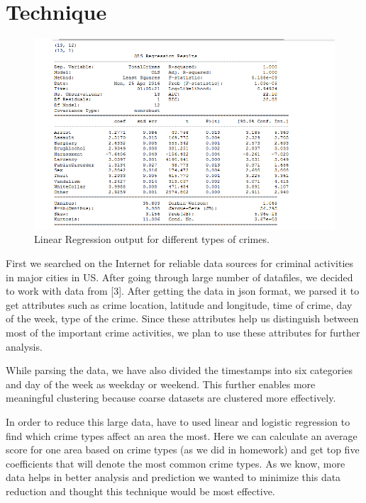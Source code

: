 \documentclass[journal, a4paper]{IEEEtran}
\begin{document}
\section{Technique}

    \begin{figure}[!hbt]
        \begin{center}
        \includegraphics[width=\columnwidth]{regression.png}
        \caption{Linear Regression output for different types of crimes.}
        \label{fig:tf_plot}
        \end{center}
    \end{figure}

    First we searched on the Internet for reliable data sources for criminal activities in major cities in US. After going through large number of datafiles, we decided to work with data from [3]. After getting the data in json format, we parsed it to get attributes such as crime location, latitude and longitude, time of crime, day of the week, type of the crime. Since these attributes help us distinguish between most of the important crime activities, we plan to use these attributes for further analysis. 

    While parsing the data, we have also divided the timestamps into six categories and day of the week as weekday or weekend. This further enables more meaningful clustering because coarse datasets are clustered more effectively.

    In order to reduce this large data, have to used linear and logistic regression to find which crime types affect an area the most. Here we can calculate an average score for one area based on crime types (as we did in homework) and get top five coefficients that will denote the most common crime types. As we know, more data helps in better analysis and prediction we wanted to minimize this data reduction and thought this technique would be most effective.
\end{document}
